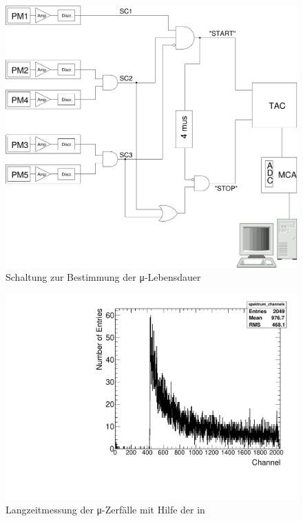 \begin{figure}[ht!]
  \centering
  \includegraphics[width=\columnwidth,keepaspectratio=true]{muon_messung}
  \caption{Schaltung zur Bestimmung der μ-Lebensdauer}
  \label{fig:muon_schaltung}
\end{figure}


\begin{figure}[ht!]
  \centering
  \includegraphics[width=\columnwidth,keepaspectratio=true]{messung}
  \caption{Langzeitmessung der μ-Zerfälle mit Hilfe der in}
  \label{fig:messung}
\end{figure}

